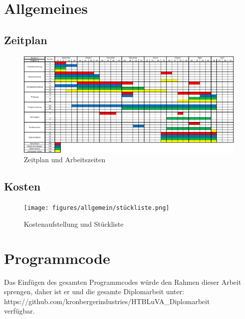 \appendix
\chapter{Allgemeines}

\newpage

\section{Zeitplan}

\begin{figure} [H]
	\begin{center}
		\includegraphics[angle=90, scale=0.6] {figures/allgemein/zeitplan.png}
		\caption{Zeitplan und Arbeitszeiten}
		\label{fig:Zeitplan}
	\end{center}
\end{figure}

\newpage

\section{Kosten}

\begin{figure} [H]
	\begin{center}
		\texttt{[image: figures/allgemein/stückliste.png]}
		\caption{Kostenaufstellung und Stückliste}
		\label{fig:Stückliste}
	\end{center}
\end{figure}

\newpage

\chapter{Programmcode}

Das Einfügen des gesamten Programmcodes würde den Rahmen dieser Arbeit sprengen, daher ist er und die gesamte Diplomarbeit unter: https://github.com/kronbergerindustries/HTBLuVA\_Diplomarbeit\\verfügbar.


